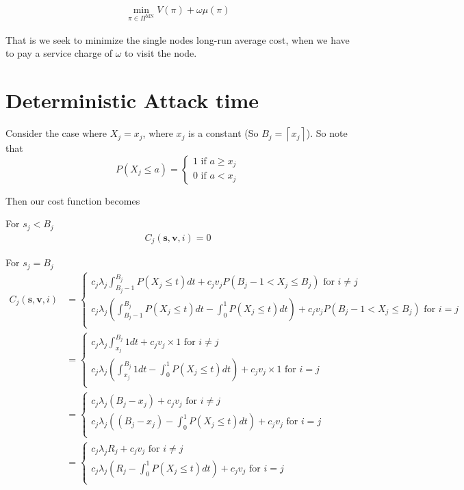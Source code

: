 \documentclass[a4paper,10pt]{article}
\newcommand{\ceil}[1]{\left \lceil #1 \right \rceil}
\theoremstyle{definition}
\theoremstyle{definition}
\theoremstyle{remark}
\theoremstyle{definition}
\begin{document}
\begin{align*}
\min_{\pi \in \Pi^{\text{MN}}} V(\pi) + \omega \mu(\pi)
\end{align*}


That is we seek to minimize the single nodes long-run average cost, when we have to pay a service charge of $\omega$ to visit the node.

\section{Deterministic Attack time}
Consider the case where $X_{j}=x_{j}$, where $x_{j}$ is a constant (So $B_{j}=\ceil{x_{j}}$). So note that 
$$P(X_{j} \leq a)=\begin{cases}
1 \text{ if } a \geq x_{j} \\
0 \text{ if } a < x_{j}
\end{cases}$$

Then our cost function becomes

For $s_{j} < B_{j}$
\begin{align*}
C_{j}(\bm{s},\bm{v},i)=0
\end{align*}

For $s_{j}=B_{j}$
\begin{align*}
C_{j}(\bm{s},\bm{v},i)&=\begin{cases}
c_{j} \lambda_{j} \int_{B_{j}-1}^{B_{j}} P(X_{j} \leq t) dt + c_{j} v_{j} P(B_{j}-1 < X_{j} \leq B_{j}) \text{ for } i \neq j \\
c_{j} \lambda_{j} (\int_{B_{j}-1}^{B_{j}} P(X_{j} \leq t) dt - \int_{0}^{1} P(X_{j} \leq t) dt) + c_{j} v_{j} P(B_{j}-1 < X_{j} \leq B_{j}) \text{ for } i=j \\
\end{cases} \\
&=\begin{cases}
c_{j} \lambda_{j} \int_{x_{j}}^{B_{j}} 1 dt + c_{j} v_{j} \times 1 \text{ for } i \neq j \\
c_{j} \lambda_{j} (\int_{x_{j}}^{B_{j}} 1 dt - \int_{0}^{1} P(X_{j} \leq t) dt) + c_{j} v_{j} \times 1 \text{ for } i=j \\
\end{cases} \\
&=\begin{cases}
c_{j} \lambda_{j} (B_{j}-x_{j}) + c_{j} v_{j}  \text{ for } i \neq j \\
c_{j} \lambda_{j} ((B_{j}-x_{j}) - \int_{0}^{1} P(X_{j} \leq t) dt) + c_{j} v_{j} \text{ for } i=j \\
\end{cases} \\
&=\begin{cases}
c_{j} \lambda_{j} R_{j} + c_{j} v_{j}  \text{ for } i \neq j \\
c_{j} \lambda_{j} (R_{j} - \int_{0}^{1} P(X_{j} \leq t) dt) + c_{j} v_{j} \text{ for } i=j \\
\end{cases}  
\end{align*}
\end{document}
